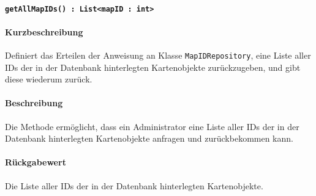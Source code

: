 \paragraph{\texttt{getAllMapIDs() : List<mapID : int>}}%
\paragraph*{Kurzbeschreibung}
Definiert das Erteilen der Anweisung an Klasse \texttt{MapIDRepository}, eine Liste aller IDs der in der Datenbank hinterlegten Kartenobjekte zurückzugeben, und gibt diese wiederum zurück.
\paragraph*{Beschreibung}
Die Methode ermöglicht, dass ein Administrator eine Liste aller IDs der in der Datenbank hinterlegten Kartenobjekte anfragen und zurückbekommen kann.
\paragraph*{Rückgabewert}
Die Liste aller IDs der in der Datenbank hinterlegten Kartenobjekte.
